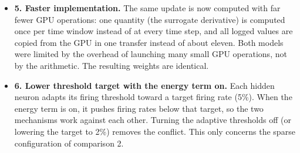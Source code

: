 \documentclass{article}
\begin{document}
{\begin{itemize}
  \item \textbf{5. Faster implementation.} The same update is now computed with far fewer GPU operations: one quantity (the surrogate derivative) is computed once per time window instead of at every time step, and all logged values are copied from the GPU in one transfer instead of about eleven. Both models were limited by the overhead of launching many small GPU operations, not by the arithmetic. The resulting weights are identical.
  \item \textbf{6. Lower threshold target with the energy term on.} Each hidden neuron adapts its firing threshold toward a target firing rate (5\%). When the energy term is on, it pushes firing rates below that target, so the two mechanisms work against each other. Turning the adaptive thresholds off (or lowering the target to 2\%) removes the conflict. This only concerns the sparse configuration of comparison 2.
\end{itemize}
}
\end{document}
